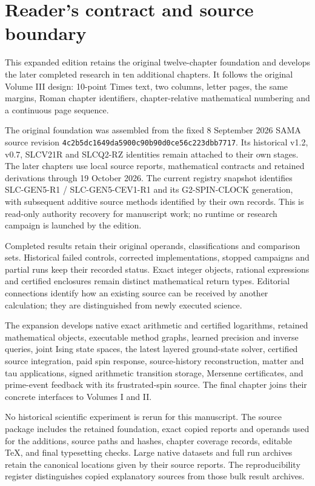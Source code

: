 \section*{Reader's contract and source boundary}
{}
This expanded edition retains the original twelve-chapter foundation and develops the later completed research in ten additional chapters. It follows the original Volume III design: 10-point Times text, two columns, letter pages, the same margins, Roman chapter identifiers, chapter-relative mathematical numbering and a continuous page sequence.

The original foundation was assembled from the fixed 8 September 2026 SAMA source revision \texttt{4c2b5dc1649da5900c90b90d0ce56c223dbb7717}. Its historical v1.2, v0.7, SLCV21R and SLCQ2-RZ identities remain attached to their own stages. The later chapters use local source reports, mathematical contracts and retained derivations through 19 October 2026. The current registry snapshot identifies SLC-GEN5-R1 / SLC-GEN5-CEV1-R1 and its G2-SPIN-CLOCK generation, with subsequent additive source methods identified by their own records. This is read-only authority recovery for manuscript work; no runtime or research campaign is launched by the edition.

Completed results retain their original operands, classifications and comparison sets. Historical failed controls, corrected implementations, stopped campaigns and partial runs keep their recorded status. Exact integer objects, rational expressions and certified enclosures remain distinct mathematical return types. Editorial connections identify how an existing source can be received by another calculation; they are distinguished from newly executed science.

The expansion develops native exact arithmetic and certified logarithms, retained mathematical objects, executable method graphs, learned precision and inverse queries, joint Ising state spaces, the latest layered ground-state solver, certified source integration, paid spin response, source-history reconstruction, matter and tau applications, signed arithmetic transition storage, Mersenne certificates, and prime-event feedback with its frustrated-spin source. The final chapter joins their concrete interfaces to Volumes I and II.

No historical scientific experiment is rerun for this manuscript. The source package includes the retained foundation, exact copied reports and operands used for the additions, source paths and hashes, chapter coverage records, editable TeX, and final typesetting checks. Large native datasets and full run archives retain the canonical locations given by their source reports. The reproducibility register distinguishes copied explanatory sources from those bulk result archives.


